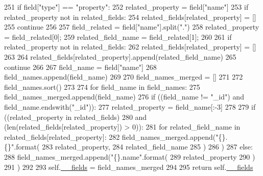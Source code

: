 \begin{DoxyCode}
251                 \textcolor{keywordflow}{if} field[\textcolor{stringliteral}{"type"}] == \textcolor{stringliteral}{"property"}:
252                     related\_property = field[\textcolor{stringliteral}{"name"}]
253                     \textcolor{keywordflow}{if} related\_property \textcolor{keywordflow}{not} \textcolor{keywordflow}{in} related\_fields:
254                         related\_fields[related\_property] = []
255                     \textcolor{keywordflow}{continue}
256 
257                 field\_related = field[\textcolor{stringliteral}{"name"}].split(\textcolor{stringliteral}{"."})
258                 related\_property = field\_related[0];
259                 related\_field\_name = field\_related[1];
260 
261                 \textcolor{keywordflow}{if} related\_property \textcolor{keywordflow}{not} \textcolor{keywordflow}{in} related\_fields:
262                     related\_fields[related\_property] = []
263 
264                 related\_fields[related\_property].append(related\_field\_name)
265                 \textcolor{keywordflow}{continue}
266 
267             field\_name = field[\textcolor{stringliteral}{"name"}]
268             field\_names.append(field\_name)
269 
270         field\_names\_merged = []
271 
272         field\_names.sort()
273 
274         \textcolor{keywordflow}{for} field\_name \textcolor{keywordflow}{in} field\_names:
275             field\_names\_merged.append(field\_name)
276             \textcolor{keywordflow}{if} ((field\_name != \textcolor{stringliteral}{"\_id"}) \textcolor{keywordflow}{and} field\_name.endswith(\textcolor{stringliteral}{"\_id"})):
277                 related\_property = field\_name[:-3]
278 
279                 \textcolor{keywordflow}{if} ((related\_property \textcolor{keywordflow}{in} related\_fields)
280                     \textcolor{keywordflow}{and} (len(related\_fields[related\_property]) > 0)):
281                     \textcolor{keywordflow}{for} related\_field\_name \textcolor{keywordflow}{in} related\_fields[related\_property]:
282                         field\_names\_merged.append(\textcolor{stringliteral}{"\{\}.\{\}"}.format(
283                             related\_property,
284                             related\_field\_name
285                             )
286                         )
287                 \textcolor{keywordflow}{else}:
288                     field\_names\_merged.append(\textcolor{stringliteral}{"\{\}.name"}.format(
289                         related\_property
290                         )
291                     )
292 
293         self.\hyperlink{classtune_1_1management_1_1endpoints_1_1base_1_1TuneManagementBase_ac4a85901e26423540bf102209827a737}{\_\_fields} = field\_names\_merged
294 
295         \textcolor{keywordflow}{return} self.\hyperlink{classtune_1_1management_1_1endpoints_1_1base_1_1TuneManagementBase_ac4a85901e26423540bf102209827a737}{\_\_fields}

\end{DoxyCode}


